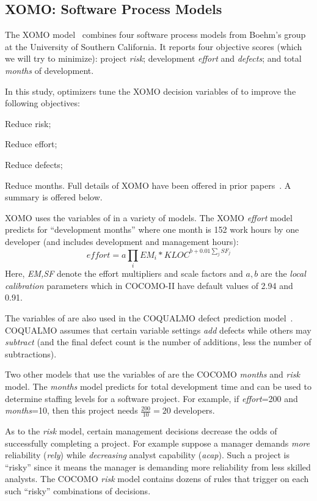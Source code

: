 
\subsection{XOMO: Software Process Models}\label{sec:xomoIs}

The XOMO model~\cite{me07f,me09a,me09e} combines four software process models from Boehm's group at the University of Southern California.
It reports four objective scores (which we will try to minimize): project {\em risk}; development {\em effort} and {\em defects}; and total {\em months} of development.


In this study, optimizers tune the XOMO  decision variables of 
to improve the following objectives:
\bi
\item Reduce risk;  
\item Reduce effort;
\item Reduce defects;
\item Reduce months.
\ei
Full details of XOMO have been offered in prior papers~\cite{me07f,me09a,me09e}. A summary is offered below.

XOMO uses the variables of    in a variety of models. The XOMO {\em effort} model predicts for 
``development months'' where one month
is 152 work hours by one developer (and includes development and management hours): 
\begin{equation}\label{eq:cocII}
\mathit{effort}=a\prod_i EM_i *\mathit{KLOC}^{b+0.01\sum_j SF_j}
\end{equation}
Here, {\em EM,SF} denote the effort multipliers and scale
factors and
 $a,b$ are the {\em local calibration} parameters which in COCOMO-II
have default values of 2.94 and 0.91.

The variables of  are also  used in
the COQUALMO defect prediction
model~\cite{boehm00b}.  COQUALMO assumes that
certain variable settings {\em add} defects while
others may {\em subtract} (and the final defect count is the number of additions, less the
number of subtractions). 

Two other models that use the variables of  are the COCOMO {\em months} and {\em risk} model.
The {\em months} model predicts for total development time and   can be used to determine staffing levels
for a software project. For example, if {\em effort}=200  
and {\em months}=10, then this project needs 
$\frac{200}{10} =20$
developers.

As to the {\em risk} model, certain management decisions decrease the 
odds of successfully completing a project. For example suppose a manager demands
{\em more}  reliability ({\em rely}) while  {\em decreasing} analyst capability ({\em acap}).
Such a project is ``risky'' since it means the manager is demanding more reliability from less skilled analysts.
The COCOMO {\em risk} model contains dozens of rules that trigger on each
such ``risky'' combinations of decisions. 

